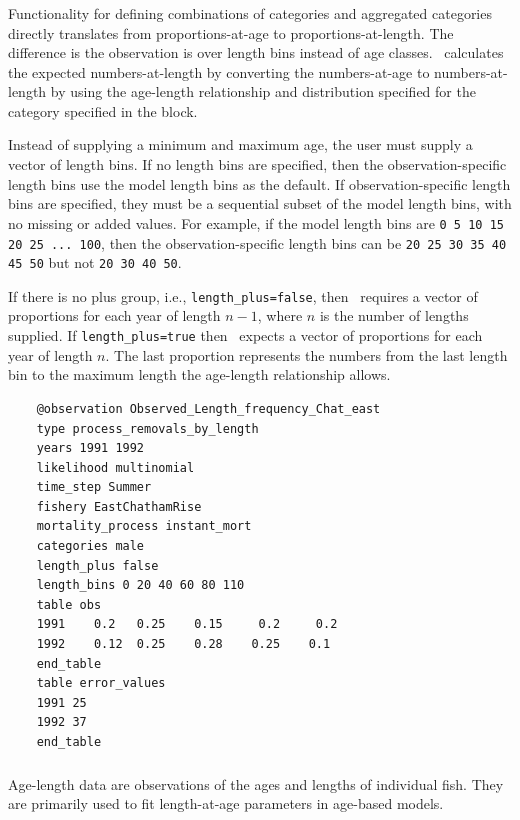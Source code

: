 \subsubsection{} \label{sec:Observation-ProportionsAtLength}

Functionality for defining combinations of categories and aggregated categories directly translates from proportions-at-age to proportions-at-length. The difference is the observation is over length bins instead of age classes. \CNAME\ calculates the expected numbers-at-length by converting the numbers-at-age to numbers-at-length by using the age-length relationship and distribution specified for the category specified in the  block.

Instead of supplying a minimum and maximum age, the user must supply a vector of length bins. If no length bins are specified, then the observation-specific length bins use the model length bins as the default. If observation-specific length bins are specified, they must be a sequential subset of the model length bins, with no missing or added values. For example, if the model length bins are \texttt{0 5 10 15 20 25 ... 100}, then the observation-specific length bins can be \texttt{20 25 30 35 40 45 50} but not \texttt{20 30 40 50}.

If there is no plus group, i.e., \texttt{length\_plus=false}, then \CNAME\ requires a vector of proportions for each year of length $n - 1$, where $n$ is the number of lengths supplied. If \texttt{length\_plus=true} then \CNAME\ expects a vector of proportions for each year of length $n$. The last proportion represents the numbers from the last length bin to the maximum length the age-length relationship allows.

{\small{\begin{verbatim}
	@observation Observed_Length_frequency_Chat_east
	type process_removals_by_length
	years 1991 1992
	likelihood multinomial
	time_step Summer
	fishery EastChathamRise
	mortality_process instant_mort
	categories male
	length_plus false
	length_bins 0 20 40 60 80 110
	table obs
	1991    0.2   0.25    0.15     0.2     0.2
	1992    0.12  0.25    0.28    0.25    0.1
	end_table
	table error_values
	1991 25
	1992 37
	end_table
\end{verbatim}}}

\subsubsection{}\label{sec:Observation-AgeLength}
Age-length data are observations of the ages and lengths of individual fish. They are primarily used to fit length-at-age parameters in age-based models. 

